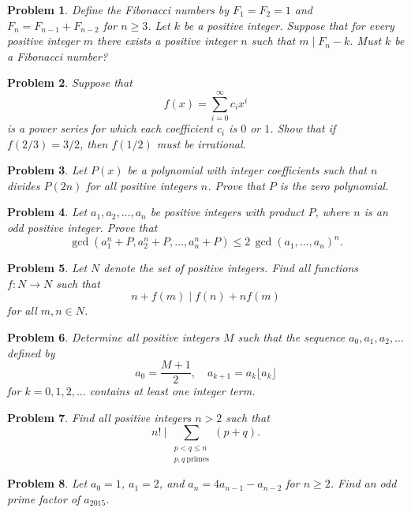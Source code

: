 \documentclass[12pt]{article}
\newtheorem{problem}{Problem}
\begin{document}
\begin{problem}
Define the Fibonacci numbers by $F_1 = F_2 = 1$ and $F_n = F_{n-1} + F_{n-2}$ for $n \geq 3$. Let $k$ be a positive integer. Suppose that for every positive integer $m$ there exists a positive integer $n$ such that $m \mid F_n - k$. Must $k$ be a Fibonacci number?
\end{problem}

\begin{problem}
Suppose that
\[
f(x) = \sum_{i = 0}^{\infty} c_i x^i
\]
is a power series for which each coefficient $c_i$ is $0$ or $1$. Show that if $f(2/3) = 3/2$, then $f(1/2)$ must be irrational.
\end{problem}

\begin{problem}
Let $P(x)$ be a polynomial with integer coefficients such that $n$ divides $P(2n)$ for all positive integers $n$. Prove that $P$ is the zero polynomial.
\end{problem}

\begin{problem}
\textbf{\textcolor{red}{\heart}}
Let $a_1, a_2, \ldots, a_n$ be positive integers with product $P$, where $n$ is an odd positive integer. Prove that
\[
\gcd(a_1^n + P, a_2^n + P, \ldots, a_n^n + P) \leq 2\, \gcd(a_1, \ldots, a_n)^n.
\]
\end{problem}

\begin{problem}
Let $N$ denote the set of positive integers. Find all functions $f : N \to N$ such that
\[
n + f(m) \mid f(n) + n f(m)
\]
for all $m, n \in N$.
\end{problem}

\begin{problem}
Determine all positive integers $M$ such that the sequence $a_0, a_1, a_2, \ldots$ defined by
\[
a_0 = \frac{M + 1}{2}, \quad a_{k+1} = a_k \lfloor a_k \rfloor
\]
for $k = 0, 1, 2, \ldots$ contains at least one integer term.
\end{problem}

\begin{problem}
Find all positive integers $n > 2$ such that
\[
n!\ \Bigg|\ \sum_{\substack{p < q \leq n \\ p, q\ \text{primes}}} (p + q).
\]
\end{problem}

\begin{problem}
Let $a_0 = 1$, $a_1 = 2$, and $a_n = 4 a_{n-1} - a_{n-2}$ for $n \geq 2$. Find an odd prime factor of $a_{2015}$.
\end{problem}
\end{document}
